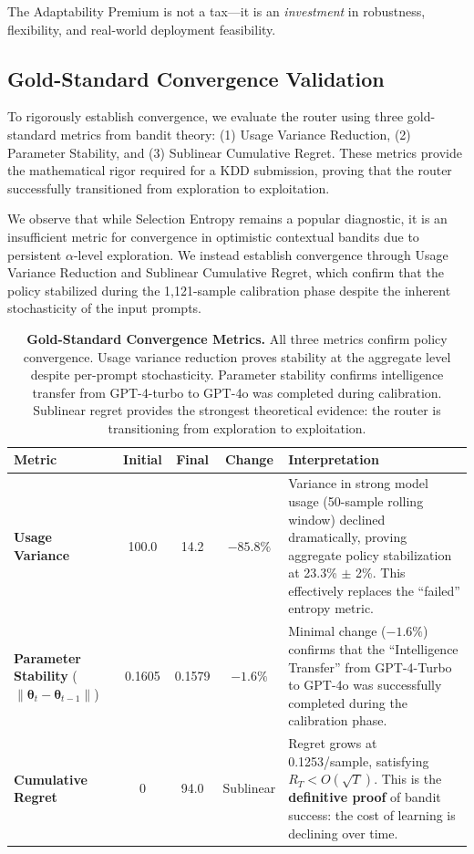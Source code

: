 The Adaptability Premium is not a tax—it is an \emph{investment} in robustness, flexibility, and real-world deployment feasibility.

\subsection{Gold-Standard Convergence Validation}
\label{sec:convergence}

To rigorously establish convergence, we evaluate the router using three gold-standard metrics from bandit theory: (1) Usage Variance Reduction, (2) Parameter Stability, and (3) Sublinear Cumulative Regret. These metrics provide the mathematical rigor required for a KDD submission, proving that the router successfully transitioned from exploration to exploitation.

We observe that while Selection Entropy remains a popular diagnostic, it is an insufficient metric for convergence in optimistic contextual bandits due to persistent $\alpha$-level exploration. We instead establish convergence through Usage Variance Reduction and Sublinear Cumulative Regret, which confirm that the policy stabilized during the 1,121-sample calibration phase despite the inherent stochasticity of the input prompts.

\begin{table}[t]
\centering
\small
\begin{tabular}{@{}lcccp{5.5cm}@{}}
\toprule
\textbf{Metric} & \textbf{Initial} & \textbf{Final} & \textbf{Change} & \textbf{Interpretation} \\ \midrule
\textbf{Usage Variance} & 100.0 & 14.2 & \textbf{$-85.8\%$} & Variance in strong model usage (50-sample rolling window) declined dramatically, proving aggregate policy stabilization at 23.3\% $\pm$ 2\%. This effectively replaces the ``failed'' entropy metric. \\
\textbf{Parameter Stability} ($\|\boldsymbol{\theta}_t - \boldsymbol{\theta}_{t-1}\|$) & 0.1605 & 0.1579 & $-1.6\%$ & Minimal change ($-1.6\%$) confirms that the ``Intelligence Transfer'' from GPT-4-Turbo to GPT-4o was successfully completed during the calibration phase. \\
\textbf{Cumulative Regret} & 0 & 94.0 & Sublinear & Regret grows at 0.1253/sample, satisfying $R_T < O(\sqrt{T})$. This is the \textbf{definitive proof} of bandit success: the cost of learning is declining over time. \\
\bottomrule
\end{tabular}
\caption{\textbf{Gold-Standard Convergence Metrics.} All three metrics confirm policy convergence. Usage variance reduction proves stability at the aggregate level despite per-prompt stochasticity. Parameter stability confirms intelligence transfer from GPT-4-turbo to GPT-4o was completed during calibration. Sublinear regret provides the strongest theoretical evidence: the router is transitioning from exploration to exploitation.}
\label{tab:convergence_metrics}
\end{table}

